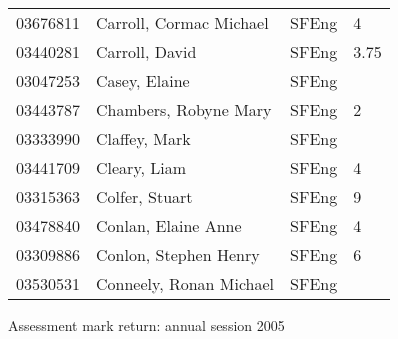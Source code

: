 \documentclass[a4paper]{article}
\begin{document}
\begin{tabular}{llll}
03676811&Carroll, Cormac Michael&SFEng&4\\
03440281&Carroll, David&SFEng&3.75\\
03047253&Casey, Elaine&SFEng&\\
03443787&Chambers, Robyne Mary&SFEng&2\\
03333990&Claffey, Mark&SFEng&\\
03441709&Cleary, Liam&SFEng&4\\
03315363&Colfer, Stuart&SFEng&9\\
03478840&Conlan, Elaine Anne&SFEng&4\\
03309886&Conlon, Stephen Henry&SFEng&6\\
03530531&Conneely, Ronan Michael&SFEng&\\
\end{tabular}
\newpage
\begin{center}
Assessment mark return: annual session 2005
\end{center}
\end{document}
